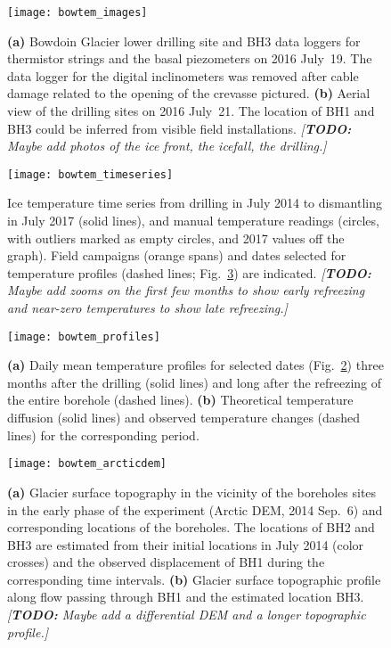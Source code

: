 \documentclass[utf8]{article}
\newcommand{\todo}[1]{\textcolor{c3}{\emph{[\textbf{TODO:} #1]}}}
\begin{document}
    \begin{figure}
      \centerline{\texttt{[image: bowtem\_images]}}
      \caption{%
        \textbf{(a)} Bowdoin Glacier lower drilling site and BH3 data loggers
          for thermistor strings and the basal piezometers on 2016 July~19. The
          data logger for the digital inclinometers was removed after cable
          damage related to the opening of the crevasse pictured.
        \textbf{(b)} Aerial view of the drilling sites on 2016 July~21. The
          location of BH1 and BH3 could be inferred from visible field
          installations.
        \todo{Maybe add photos of the ice front, the icefall, the drilling.}}
      \label{fig:images}
    \end{figure}

    \begin{figure}
      \centerline{\texttt{[image: bowtem\_timeseries]}}
      \caption{%
        Ice temperature time series from drilling in July 2014 to dismantling
        in July 2017 (solid lines), and manual temperature readings (circles,
        with outliers marked as empty circles, and 2017 values off the graph).
        Field campaigns (orange spans) and dates selected for
        temperature profiles (dashed lines; Fig.~\ref{fig:profiles}) are
        indicated.
        \todo{Maybe add zooms on the first few months to show early refreezing
              and near-zero temperatures to show late refreezing.}}
      \label{fig:timeseries}
    \end{figure}

    \begin{figure}
      \centerline{\texttt{[image: bowtem\_profiles]}}
      \caption{%
        \textbf{(a)} Daily mean temperature profiles for selected dates
          (Fig.~\ref{fig:timeseries}) three months after the drilling (solid
          lines) and long after the refreezing of the entire borehole (dashed
          lines).
        \textbf{(b)} Theoretical temperature diffusion (solid lines) and
          observed temperature changes (dashed lines) for the corresponding
          period.}
      \label{fig:profiles}
    \end{figure}

    \begin{figure}
      \centerline{\texttt{[image: bowtem\_arcticdem]}}
      \caption{%
        \textbf{(a)} Glacier surface topography in the vicinity of the
          boreholes sites in the early phase of the experiment (Arctic DEM,
          2014 Sep.~6) and corresponding locations of the boreholes. The
          locations of BH2 and BH3 are estimated from their initial locations
          in July 2014 (color crosses) and the observed displacement of BH1
          during the corresponding time intervals.
        \textbf{(b)} Glacier surface topographic profile along flow
          passing through BH1 and the estimated location BH3.
        \todo{Maybe add a differential DEM and a longer topographic profile.}}
      \label{fig:arcticdem}
    \end{figure}
\end{document}
